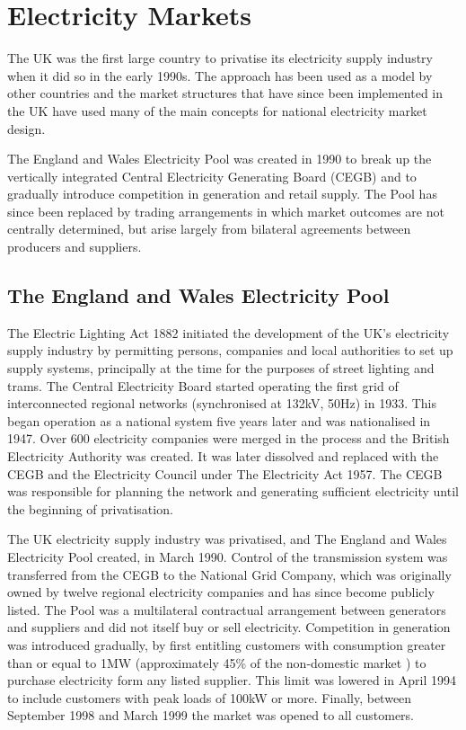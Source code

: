 \section{Electricity Markets}
The UK was the first large country to privatise its electricity supply industry
when it did so in the early 1990s.  The approach has been used as a model by
other countries and the market structures that have since been implemented in
the UK have used many of the main concepts for national electricity market
design.

The England and Wales Electricity Pool was created in 1990 to break up the
vertically integrated Central Electricity Generating Board (CEGB) and to
gradually introduce competition in generation and retail supply.
The Pool has since been
replaced by trading arrangements in which market outcomes are not centrally
determined, but arise largely from bilateral agreements between producers and
suppliers.

\subsection{The England and Wales Electricity Pool}
\label{sec:thepool}
The Electric Lighting Act 1882 initiated the development of the UK's electricity
supply industry by permitting persons, companies and local authorities to set up
supply systems, principally at the time for the purposes of street lighting and
trams.  The Central Electricity Board started operating the first grid of
interconnected regional networks (synchronised at 132kV, 50Hz) in 1933. This
began operation as a national system five years later and was nationalised in
1947.  Over 600 electricity companies were merged in the process and the British
Electricity Authority was created.  It was later dissolved and replaced with the
CEGB and the Electricity Council under The Electricity Act 1957.  The CEGB was
responsible for planning the network and generating sufficient electricity until
the beginning of privatisation.

The UK electricity supply industry was privatised, and The England and Wales
Electricity Pool created, in March 1990.  Control of the transmission system was
transferred from the CEGB to the National Grid Company, which was originally
owned by twelve regional electricity companies and has since become publicly
listed.  The Pool was a multilateral contractual arrangement between generators
and suppliers and did not itself buy or sell electricity.  Competition in
generation was introduced gradually, by first entitling customers with
consumption greater than or equal to 1MW (approximately 45\% of the non-domestic
market \cite{decc:dukes09}) to purchase electricity form any listed supplier.
This limit was lowered in April 1994 to include customers with peak loads of
100kW or more.  Finally, between September 1998 and March 1999 the market was
opened to all customers.

